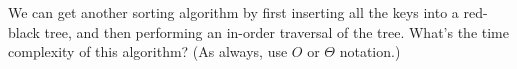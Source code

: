 We can get another sorting algorithm by first inserting all the keys
into a red-black tree, and then performing an in-order traversal of the
tree. What's the time complexity of this algorithm?  (As always, use
$O$ or $\Theta$  notation.)
